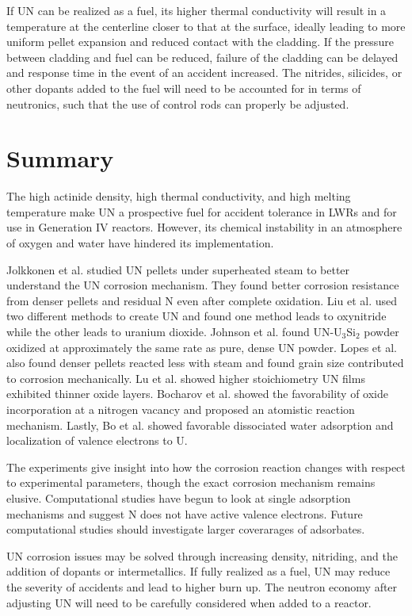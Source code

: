 \documentclass[11pt]{article}
\begin{document}
\begin{multicols}{2}
\par 
If UN can be realized as a fuel, its higher thermal conductivity will result in a temperature at the centerline closer to that at the surface, ideally leading to more uniform pellet expansion and reduced contact with the cladding. If the pressure between cladding and fuel can be reduced, failure of the cladding can be delayed and response time in the event of an accident increased. The nitrides, silicides, or other dopants added to the fuel will need to be accounted for in terms of neutronics, such that the use of control rods can properly be adjusted.

\par 




\section{Summary}
The high actinide density, high thermal conductivity, and high melting temperature make UN a prospective fuel for accident tolerance in LWRs and for use in Generation IV reactors. However, its chemical instability in an atmosphere of oxygen and water have hindered its implementation. 
\par Jolkkonen et al. \cite{Jolkkonen2017} studied UN pellets under superheated steam to better understand the UN corrosion mechanism. They found better corrosion resistance from denser pellets and residual N even after complete oxidation. Liu et al. \cite{Liu2013} used two different methods to create UN and found one method leads to oxynitride while the other leads to uranium dioxide. Johnson et al. \cite{Johnson2016} found UN-U$_{3}$Si$_{2}$ powder oxidized at approximately the same rate as pure, dense UN powder. Lopes et al. \cite{Lopes2017} also found denser pellets reacted less with steam and found grain size contributed to corrosion mechanically. Lu et al. showed higher stoichiometry UN films exhibited thinner oxide layers. Bocharov et al. \cite{Bocharov2013} showed the favorability of oxide incorporation at a nitrogen vacancy and proposed an atomistic reaction mechanism. Lastly, Bo et al. \cite{Bo2016} showed favorable dissociated water adsorption and localization of valence electrons to U.
\par The experiments give insight into how the corrosion reaction changes with respect to experimental parameters, though the exact corrosion mechanism remains elusive. Computational studies have begun to look at single adsorption mechanisms and suggest N does not have active valence electrons. Future computational studies should investigate larger coverarages of adsorbates. 
\par 
UN corrosion issues may be solved through increasing density, nitriding, and the addition of dopants or intermetallics. If fully realized as a fuel, UN may reduce the severity of accidents and lead to higher burn up. The neutron economy after adjusting UN will need to be carefully considered when added to a reactor.





\end{multicols}
\end{document}
